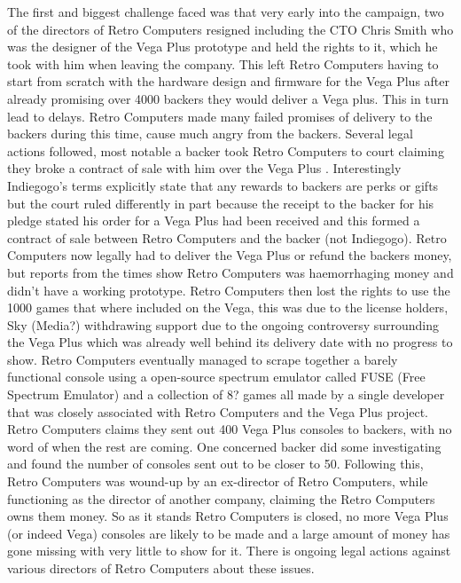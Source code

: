 The first and biggest challenge faced was that very early into the campaign, two of the directors of Retro Computers resigned including the CTO Chris Smith who was the designer of the Vega Plus prototype and held the rights to it, which he took with him when leaving the company. This left Retro Computers having to start from scratch with the hardware design and firmware for the Vega Plus after already promising over 4000 backers they would deliver a Vega plus. This in turn lead to delays. Retro Computers made many failed promises of delivery to the backers during this time, cause much angry from the backers. Several legal actions followed, most notable a backer took Retro Computers to court claiming they broke a contract of sale with him over the Vega Plus \cite{RN122}. Interestingly Indiegogo's terms explicitly state that any rewards to backers are perks or gifts but the court ruled differently in part because the receipt to the backer for his pledge stated his order for a Vega Plus had been received and this formed a contract of sale between Retro Computers and the backer (not Indiegogo). Retro Computers now legally had to deliver the Vega Plus or refund the backers money, but reports from the times show Retro Computers was haemorrhaging money and didn't have a working prototype. Retro Computers then lost the rights to use the 1000 games that where included on the Vega, this was due to the license holders, Sky (Media?) withdrawing support due to the ongoing controversy surrounding the Vega Plus which was already well behind its delivery date with no progress to show. Retro Computers eventually managed to scrape together a barely functional console using a open-source spectrum emulator called FUSE (Free Spectrum Emulator) and a collection of 8? games all made by a single developer that was closely associated with Retro Computers and the Vega Plus project. Retro Computers claims they sent out 400 Vega Plus consoles to backers, with no word of when the rest are coming. One concerned backer did some investigating and found the number of consoles sent out to be closer to 50. Following this, Retro Computers was wound-up by an ex-director of Retro Computers, while functioning as the director of another company, claiming the Retro Computers owns them money. So as it stands Retro Computers is closed, no more Vega Plus (or indeed Vega) consoles are likely to be made and a large amount of money has gone missing with very little to show for it. There is ongoing legal actions against various directors of Retro Computers about these issues.

